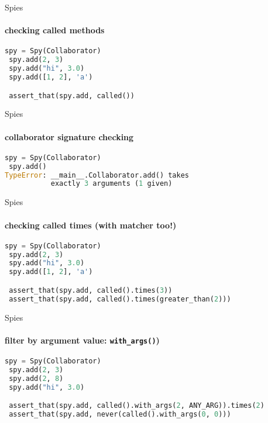 \documentclass[11pt]{beamer}
\begin{document}
\begin{frame}[fragile]{Spies}
\framesubtitle{checking called methods}

\begin{exampleblock}{}
\begin{lstlisting}[language=Python]
 spy = Spy(Collaborator)
 spy.add(2, 3)
 spy.add("hi", 3.0)
 spy.add([1, 2], 'a')

 assert_that(spy.add, called())
\end{lstlisting}
\end{exampleblock}

\end{frame}

\begin{frame}[fragile]{Spies}
\framesubtitle{collaborator signature checking}

\begin{exampleblock}{}
\begin{lstlisting}[language=Python]
 spy = Spy(Collaborator)
 spy.add()
TypeError: __main__.Collaborator.add() takes
           exactly 3 arguments (1 given)
\end{lstlisting}
\end{exampleblock}

\end{frame}

\begin{frame}[fragile]{Spies}
\framesubtitle{checking called times (with matcher too!)}

\begin{exampleblock}{}
\begin{lstlisting}[language=Python]
 spy = Spy(Collaborator)
 spy.add(2, 3)
 spy.add("hi", 3.0)
 spy.add([1, 2], 'a')

 assert_that(spy.add, called().times(3))
 assert_that(spy.add, called().times(greater_than(2)))
\end{lstlisting}
\end{exampleblock}

\end{frame}

\begin{frame}[fragile]{Spies}
\framesubtitle{filter by argument value: \texttt{with\_args()})}

\begin{exampleblock}{}
\begin{lstlisting}[language=Python]
 spy = Spy(Collaborator)
 spy.add(2, 3)
 spy.add(2, 8)
 spy.add("hi", 3.0)

 assert_that(spy.add, called().with_args(2, ANY_ARG)).times(2)
 assert_that(spy.add, never(called().with_args(0, 0)))
\end{lstlisting}
\end{exampleblock}
\end{frame}
\end{document}

